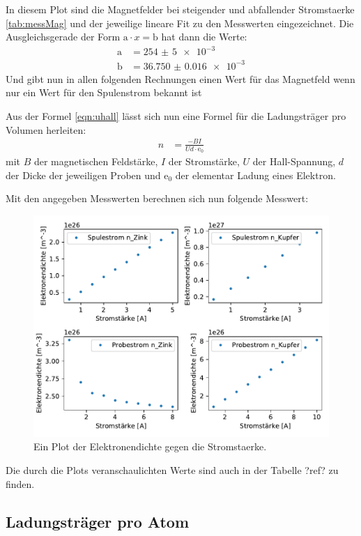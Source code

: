     In diesem Plot sind die Magnetfelder bei steigender und abfallender Stromstaerke \ref{tab:messMag} und der jeweilige lineare Fit zu den 
    Messwerten eingezeichnet.
    Die Ausgleichsgerade der Form $\text{a}\cdot x = \text{b}$ hat dann die Werte:
    \begin{align}
        \text{a} & = \num{254(5)e-3}\\
        \text{b} & = \num{36.750(16)e-3}
    \end{align}
    Und gibt nun in allen folgenden Rechnungen einen Wert für das Magnetfeld wenn nur ein Wert für den Spulenstrom bekannt ist


    Aus der Formel \ref{eqn:uhall} lässt sich nun eine Formel für die Ladungsträger pro Volumen herleiten:
    \begin{align}
        n &= \frac{-BI}{Ud\cdot\text{e}_0}
    \end{align}
    mit $B$ der magnetischen Feldstärke, $I$ der Stromstärke, $U$ der Hall-Spannung, $d$ der Dicke der jeweiligen Proben und $\text{e}_0$ der 
    elementar Ladung eines Elektron.

    Mit den angegeben Messwerten berechnen sich nun folgende Messwert:
    \begin{figure}[H]
        \centering
        \includegraphics[width=1.1\textwidth]{build/n.pdf}
        \caption{Ein Plot der Elektronendichte gegen die Stromstaerke.}
        \label{img:elekdichte}
    \end{figure}
    Die durch die Plots veranschaulichten Werte sind auch in der Tabelle ?ref? zu finden.


    \subsection{Ladungsträger pro Atom}


